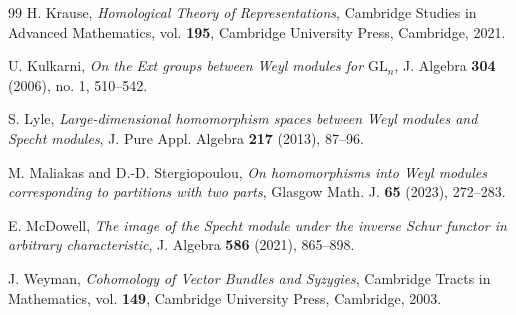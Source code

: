 \documentclass[11pt]{amsart}
\theoremstyle{remark}
\theoremstyle{definition}
\numberwithin{equation}{section}
\begin{document}
\begin{thebibliography}{99}
H. Krause,
	\emph{Homological Theory of Representations},
	Cambridge Studies in Advanced Mathematics, vol. \textbf{195},
	Cambridge University Press, Cambridge, 2021.

U. Kulkarni,
	\emph{On the Ext groups between Weyl modules for $\mathrm{GL}_n$},
	J. Algebra \textbf{304} (2006), no. 1, 510--542.

S. Lyle,
	\emph{Large-dimensional homomorphism spaces between Weyl modules
		and Specht modules},
	J. Pure Appl. Algebra \textbf{217} (2013), 87--96.

M. Maliakas and D.-D. Stergiopoulou,
	\emph{On homomorphisms into Weyl modules corresponding to partitions
		with two parts},
	Glasgow Math. J. \textbf{65} (2023), 272--283.

E. McDowell,
	\emph{The image of the Specht module under the inverse Schur
		functor in arbitrary characteristic},
	J. Algebra \textbf{586} (2021), 865--898.

J. Weyman,
\emph{Cohomology of Vector Bundles and Syzygies},
Cambridge Tracts in Mathematics, vol. \textbf{149},
Cambridge University Press, Cambridge, 2003.
\end{thebibliography}
\end{document}
